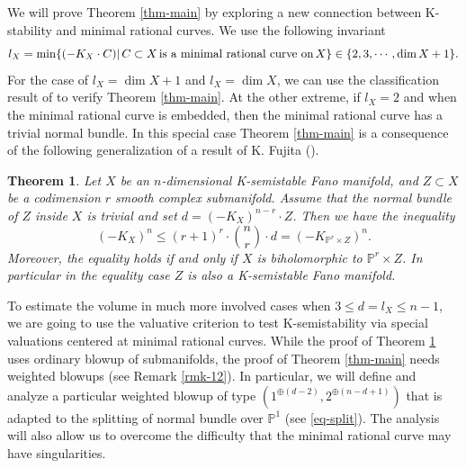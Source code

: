 \documentclass[12pt]{amsart}
\newtheorem{thm}{Theorem}[section]
\theoremstyle{definition}
\def\min{{\rm min}}
\def\vol{{\rm vol}}
\newcommand{\IP}{{\mathbb P}}
\newcommand{\CO}{{\mathcal O}}
\newcommand{\lee}{\leqslant}
\begin{document}
We will prove Theorem \ref{thm-main} by exploring a new connection between K-stability and minimal rational curves. We use the following invariant 
$$
l_X=\min\{(-K_X\cdot C)|\, C\subset X \, \text{is a minimal rational curve on}\, X\}\in \{2,3,\cdots, \dim X+1\}.
$$ 
For the case of $l_X=\dim X+1$ and $l_X=\dim X$, we can use the classification result of \cite{CMS02, Miy04,CD15,DH17} to verify Theorem \ref{thm-main}.
At the other extreme, if $l_X=2$ and when the minimal rational curve is embedded, then the minimal rational curve has a trivial normal bundle. In this special case Theorem \ref{thm-main} is a consequence of the following generalization of a result of K. Fujita (\cite{Fuj18}). 


\begin{thm}\label{thm-ntrivial}
    Let $X$ be an $n$-dimensional K-semistable Fano manifold, and $Z\subset X$ be a codimension $r$ smooth complex submanifold. Assume that the normal bundle of $Z$ inside $X$ is trivial and set $d = (-K_X)^{n-r}\cdot Z$. Then we have the inequality 
    \begin{equation}\label{eq-volprod}
    (-K_X)^n \lee (r+1)^r\cdot \binom{n}{r}\cdot d=(-K_{\IP^r\times Z})^n.
    \end{equation}
    Moreover, the equality holds if and only if $X$ is biholomorphic to $\IP^r\times Z$. In particular in the equality case $Z$ is also a K-semistable Fano manifold. 
\end{thm}

To estimate the volume in much more involved cases when $3\leq d=l_X\leq n-1$, we are going to use the valuative criterion to test K-semistability via  special valuations centered at minimal rational curves. 
While the proof of Theorem \ref{thm-ntrivial} uses ordinary blowup of submanifolds, the proof of Theorem \ref{thm-main} needs weighted blowups (see Remark \ref{rmk-12}). 
In particular, we will define and analyze a particular weighted blowup of type $({1}^{\oplus (d-2)}, 2^{\oplus (n-d+1)})$ that is adapted to the splitting of normal bundle over $\IP^1$ (see \eqref{eq-split}). 
The analysis will also allow us to overcome the difficulty that the minimal rational curve may have singularities.  
\end{document}
